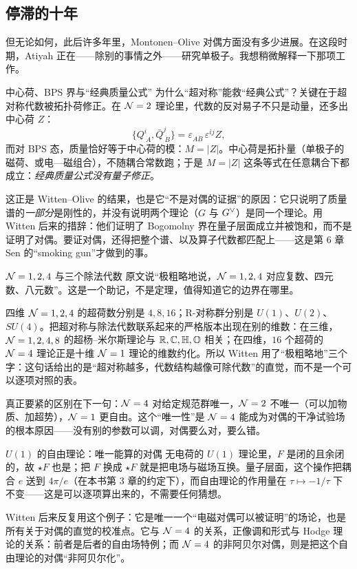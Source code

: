 \subsection{停滞的十年}

但无论如何，此后许多年里，Montonen--Olive 对偶方面没有多少进展。在这段时期，Atiyah 正在——除别的事情之外——研究单极子。我想稍微解释一下那项工作。

\begin{pizhu}{中心荷、BPS 界与“经典质量公式”}
为什么“超对称”能救“经典公式”？关键在于超对称代数被拓扑荷修正。在 $\mathcal{N}=2$ 理论里，代数的反对易子不只是动量，还多出中心荷 $Z$：
\[
  \{Q^i_{\ \dot A},\bar Q^{j}_{\ \dot B}\}=\varepsilon_{\dot A\dot B}\,\varepsilon^{ij}Z ,
\]
而对 BPS 态，质量恰好等于中心荷的模：$M=|Z|$。中心荷是拓扑量（单极子的磁荷、或电—磁组合），不随耦合常数跑；于是 $M=|Z|$ 这条等式在任意耦合下都成立：\emph{经典质量公式没有量子修正}。

这正是 Witten--Olive 的结果，也是它“不是对偶的证据”的原因：它只说明了质量谱的\emph{一部分}是刚性的，并没有说明两个理论（$G$ 与 $G^{\vee}$）是同一个理论。用 Witten 后来的措辞：他们证明了 Bogomolny 界在量子层面成立并被饱和，而不是证明了对偶。要证对偶，还得把整个谱、以及算子代数都匹配上——这是第 6 章 Sen 的“smoking gun”才做到的事。
\end{pizhu}

\begin{pizhu}{$\mathcal{N}=1,2,4$ 与三个除法代数}
原文说“极粗略地说，$\mathcal{N}=1,2,4$ 对应复数、四元数、八元数”。这是一个助记，不是定理，值得知道它的边界在哪里。

四维 $\mathcal{N}=1,2,4$ 的超荷数分别是 $4,8,16$；R-对称群分别是 $U(1)$、$U(2)$、$SU(4)$。把超对称与除法代数联系起来的严格版本出现在别的维数：在三维，$\mathcal{N}=1,2,4,8$ 的超杨--米尔斯理论与 $\mathbb{R},\mathbb{C},\mathbb{H},\mathbb{O}$ 相关；在四维，$16$ 个超荷的 $\mathcal{N}=4$ 理论正是十维 $\mathcal{N}=1$ 理论的维数约化。所以 Witten 用了“极粗略地”三个字：这句话给出的是“超对称越多，代数结构越像可除代数”的直觉，而不是一个可以逐项对照的表。

真正要紧的区别在下一句：$\mathcal{N}=4$ 对给定规范群唯一，$\mathcal{N}=2$ 不唯一（可以加物质、加超势），$\mathcal{N}=1$ 更自由。这个“唯一性”是 $\mathcal{N}=4$ 能成为对偶的干净试验场的根本原因——没有别的参数可以调，对偶要么对，要么错。
\end{pizhu}

\begin{pizhu}{$U(1)$ 的自由理论：唯一能算的对偶}
无电荷的 $U(1)$ 理论里，$F$ 是闭的且余闭的，故 $\star F$ 也是；把 $F$ 换成 $\star F$ 就是把电场与磁场互换。量子层面，这个操作把耦合 $e$ 送到 $4\pi/e$（在本书第 3 章的约定下），而自由理论的作用量在 $\tau\mapsto-1/\tau$ 下不变——这是可以逐项算出来的，不需要任何猜想。

Witten 后来反复用这个例子：它是唯一一个“电磁对偶可以被证明”的场论，也是所有关于对偶的直觉的校准点。它与 $\mathcal{N}=4$ 的关系，正像调和形式与 Hodge 理论的关系：前者是后者的自由场特例；而 $\mathcal{N}=4$ 的非阿贝尔对偶，则是把这个自由理论的对偶“非阿贝尔化”。
\end{pizhu}
